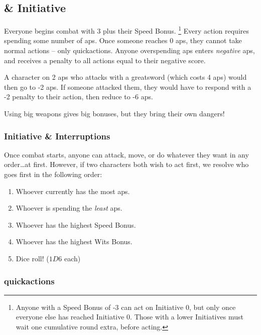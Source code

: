 \begin{multicols}{2}
\subsection{ \& Initiative}
\label{actionPoints}

Everyone begins combat with 3  plus their Speed Bonus.%
\footnote{Anyone with a Speed Bonus of -3 can act on Initiative 0, but only once everyone else has reached Initiative 0.
Those with a lower Initiatives must wait one cumulative round extra, before acting.}
Every action requires spending some number of \glspl{ap}.
Once someone reaches 0 \glspl{ap}, they cannot take normal actions -- only \glspl{quickaction}.
Anyone overspending \glspl{ap} enters \emph{negative} \glspl{ap}, and receives a penalty to all actions equal to their negative score.

A character on 2 \glspl{ap} who attacks with a greatsword (which costs 4 \glspl{ap}) would then go to -2 \glspl{ap}.
If someone attacked them, they would have to respond with a -2 penalty to their action, then reduce to -6 \glspl{ap}.

Using big weapons gives big bonuses, but they bring their own dangers!

\subsubsection{Initiative \& Interruptions}

Once combat starts, anyone can attack, move, or do whatever they want in any order\ldots at first.
However, if two characters both wish to act first, we resolve who goes first in the following order:

\begin{enumerate}
  \item
  Whoever currently has the most \glspl{ap}.
  \item
  Whoever is spending the \emph{least} \glspl{ap}.
  \item
  Whoever has the highest Speed Bonus.
  \item
  Whoever has the highest Wits Bonus.
  \item
  Dice roll! ($1D6$ each)
\end{enumerate}

\subsubsection{\Glspl{quickaction}}


\end{multicols}
